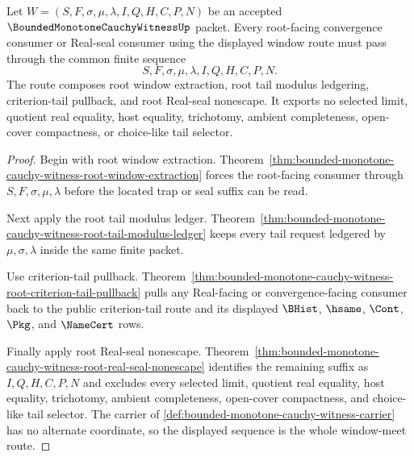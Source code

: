\begin{theorem}
\label{thm:bounded-monotone-cauchy-witness-window-meet-route}
Let $W=(S,F,\sigma,\mu,\lambda,I,Q,H,C,P,N)$ be an accepted $\BoundedMonotoneCauchyWitnessUp$ packet. Every root-facing convergence consumer or Real-seal consumer using the displayed window route must pass through the common finite sequence
$$
S,F,\sigma,\mu,\lambda,I,Q,H,C,P,N.
$$
The route composes root window extraction, root tail modulus ledgering, criterion-tail pullback, and root Real-seal nonescape. It exports no selected limit, quotient real equality, host equality, trichotomy, ambient completeness, open-cover compactness, or choice-like tail selector.
\end{theorem}
\begin{proof}
Begin with root window extraction. Theorem~\ref{thm:bounded-monotone-cauchy-witness-root-window-extraction} forces the root-facing consumer through $S,F,\sigma,\mu,\lambda$ before the located trap or seal suffix can be read.

Next apply the root tail modulus ledger. Theorem~\ref{thm:bounded-monotone-cauchy-witness-root-tail-modulus-ledger} keeps every tail request ledgered by $\mu,\sigma,\lambda$ inside the same finite packet.

Use criterion-tail pullback. Theorem~\ref{thm:bounded-monotone-cauchy-witness-root-criterion-tail-pullback} pulls any Real-facing or convergence-facing consumer back to the public criterion-tail route and its displayed $\BHist$, $\hsame$, $\Cont$, $\Pkg$, and $\NameCert$ rows.

Finally apply root Real-seal nonescape. Theorem~\ref{thm:bounded-monotone-cauchy-witness-root-real-seal-nonescape} identifies the remaining suffix as $I,Q,H,C,P,N$ and excludes every selected limit, quotient real equality, host equality, trichotomy, ambient completeness, open-cover compactness, and choice-like tail selector. The carrier of \autoref{def:bounded-monotone-cauchy-witness-carrier} has no alternate coordinate, so the displayed sequence is the whole window-meet route.
\end{proof}

